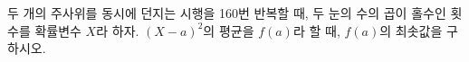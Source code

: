 두 개의 주사위를 동시에 던지는 시행을 160번 반복할 때, 두 눈의 수의 곱이 홀수인 횟수를 확률변수 $X$라 하자. $(X-a)^2$의 평균을 $f(a)$라 할 때, $f(a)$의 최솟값을 구하시오. 
